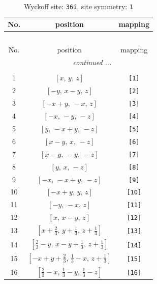 \documentclass[fleqn,8pt]{jsarticle}
\begin{document}
\renewcommand{\arraystretch}{1.2}
\begin{longtable}{ccc}
\caption{Wyckoff site: {\tt 36i}, site symmetry: {\tt 1}}
 \\
 \hline \hline
No. & position & mapping \\ \hline \endfirsthead

\multicolumn{2}{l}{\tablename\ \thetable{}} \\
 \hline \hline
No. & position & mapping \\ \hline \endhead

 \hline \hline
\multicolumn{2}{r}{\footnotesize\it continued ...} \\ \endfoot

 \hline \hline
\multicolumn{2}{r}{} \\ \endlastfoot

1 & $\left[ x,\, y,\, z \right]$ & {\tt [1]} \\ \hline
2 & $\left[ - y,\, x - y,\, z \right]$ & {\tt [2]} \\ \hline
3 & $\left[ - x + y,\, - x,\, z \right]$ & {\tt [3]} \\ \hline
4 & $\left[ - x,\, - y,\, - z \right]$ & {\tt [4]} \\ \hline
5 & $\left[ y,\, - x + y,\, - z \right]$ & {\tt [5]} \\ \hline
6 & $\left[ x - y,\, x,\, - z \right]$ & {\tt [6]} \\ \hline
7 & $\left[ x - y,\, - y,\, - z \right]$ & {\tt [7]} \\ \hline
8 & $\left[ y,\, x,\, - z \right]$ & {\tt [8]} \\ \hline
9 & $\left[ - x,\, - x + y,\, - z \right]$ & {\tt [9]} \\ \hline
10 & $\left[ - x + y,\, y,\, z \right]$ & {\tt [10]} \\ \hline
11 & $\left[ - y,\, - x,\, z \right]$ & {\tt [11]} \\ \hline
12 & $\left[ x,\, x - y,\, z \right]$ & {\tt [12]} \\ \hline
13 & $\left[ x + \frac{2}{3},\, y + \frac{1}{3},\, z + \frac{1}{3} \right]$ & {\tt [13]} \\ \hline
14 & $\left[ \frac{2}{3} - y,\, x - y + \frac{1}{3},\, z + \frac{1}{3} \right]$ & {\tt [14]} \\ \hline
15 & $\left[ - x + y + \frac{2}{3},\, \frac{1}{3} - x,\, z + \frac{1}{3} \right]$ & {\tt [15]} \\ \hline
16 & $\left[ \frac{2}{3} - x,\, \frac{1}{3} - y,\, \frac{1}{3} - z \right]$ & {\tt [16]} \\ \hline

\end{longtable}
\end{document}
